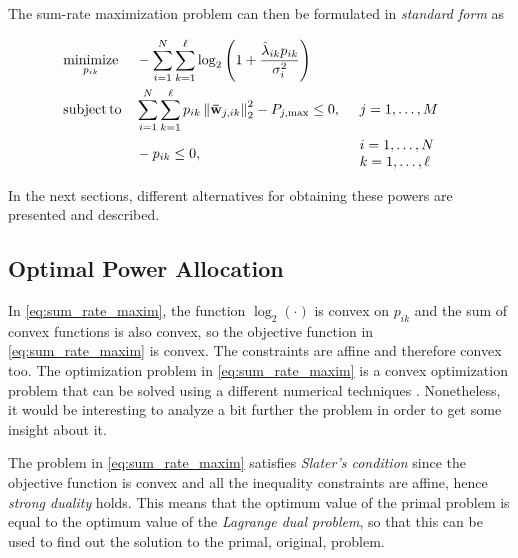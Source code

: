 The sum-rate maximization problem can then be formulated in \emph{standard form}
\cite{boyd_convex} as

\begin{equation} \label{eq:sum_rate_maxim}
\begin{aligned}
	&\operatorname*{minimize}\limits_{p_{ik}} &&-\sum\limits_{i = 1}^N
	\sum\limits_{k = 1}^\ell \log_2\left( 1 +
	\frac{\hat{\lambda}_{ik} p_{ik}}{\sigma_i^2} \right)\\
	&\operatorname*{subject\,to} &&\sum\limits_{i = 1}^N \sum\limits_{k = 1}^\ell p_{ik} \left\|
	\mathbf{\bar{w}}_{j,ik} \right\|_2^2 - P_{j,\max} \leq 0, &&
    \begin{array}{l}
        j = 1, \ldots, M
    \end{array}\\
    & &&-p_{ik} \leq 0, &&
	\begin{array}{l}
        i = 1, \ldots, N\\
        k = 1, \ldots, \ell
	\end{array}
\end{aligned}
\end{equation}

In the next sections, different alternatives for obtaining these powers are
presented and described.

\subsection{Optimal Power Allocation}\label{ssec:optimal_power_allocation}

In \eqref{eq:sum_rate_maxim}, the function $\log_2(\cdot)$ is convex on $p_{ik}$
 and the sum of convex functions is also convex, so the objective function in
\eqref{eq:sum_rate_maxim} is convex. The constraints are affine and therefore
convex too. The optimization problem in \eqref{eq:sum_rate_maxim} is a convex
optimization problem that can be solved using a different numerical techniques
\cite{boyd_convex}. Nonetheless, it would be interesting to analyze a bit
further the problem in order to get some insight about it.

The problem in \eqref{eq:sum_rate_maxim} satisfies \emph{Slater's condition}
\cite{boyd_convex} since the objective function is convex and all the
inequality constraints are affine, hence \emph{strong duality} holds. This means
that the optimum value of the primal problem is equal to the optimum value of
the \emph{Lagrange dual problem}, so that this can be used to find out the
solution to the primal, original, problem.

